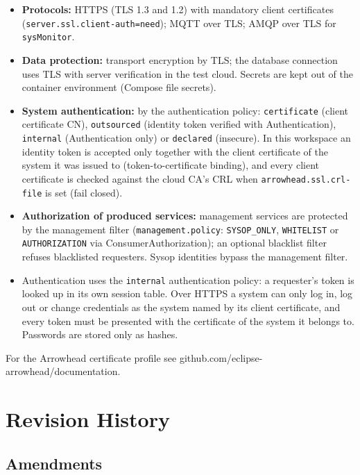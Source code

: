 \documentclass[a4paper]{arrowhead}
\begin{document}
\begin{itemize}
  \item \textbf{Protocols:} HTTPS (TLS 1.3 and 1.2) with mandatory client certificates (\texttt{server.ssl.client-auth=need}); MQTT over TLS; AMQP over TLS for \texttt{sysMonitor}.
  \item \textbf{Data protection:} transport encryption by TLS; the database connection uses TLS with server verification in the test cloud. Secrets are kept out of the container environment (Compose file secrets).
  \item \textbf{System authentication:} by the authentication policy: \texttt{certificate} (client certificate CN), \texttt{outsourced} (identity token verified with Authentication), \texttt{internal} (Authentication only) or \texttt{declared} (insecure). In this workspace an identity token is accepted only together with the client certificate of the system it was issued to (token-to-certificate binding), and every client certificate is checked against the cloud CA's CRL when \texttt{arrowhead.ssl.crl-file} is set (fail closed).
  \item \textbf{Authorization of produced services:} management services are protected by the management filter (\texttt{management.policy}: \texttt{SYSOP\_ONLY}, \texttt{WHITELIST} or \texttt{AUTHORIZATION} via ConsumerAuthorization); an optional blacklist filter refuses blacklisted requesters. Sysop identities bypass the management filter.
  \item Authentication uses the \texttt{internal} authentication policy: a requester's token is looked up in its own session table. Over HTTPS a system can only log in, log out or change credentials as the system named by its client certificate, and every token must be presented with the certificate of the system it belongs to. Passwords are stored only as hashes.
\end{itemize}

For the Arrowhead certificate profile see github.com/eclipse-arrowhead/documentation.





\newpage

\section{Revision History}
\subsection{Amendments}
\end{document}
